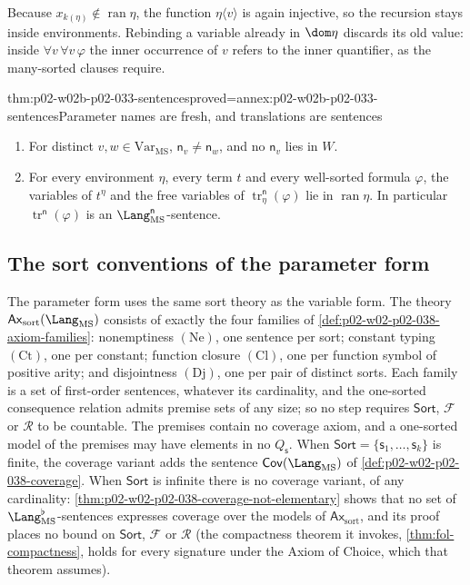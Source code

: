 Because \(x_{k(\eta)}\notin\operatorname{ran}\eta\), the function
\(\eta\langle v\rangle\) is again injective, so the recursion stays inside
environments.  Rebinding a variable already in \(\dom\eta\) discards its old
value: inside \(\forall v\,\forall v\,\varphi\) the inner occurrence of
\(v\) refers to the inner quantifier, as the many-sorted clauses require.

\begin{hblemma}{thm:p02-w02b-p02-033-sentences}{proved=annex:p02-w02b-p02-033-sentences}{Parameter names are fresh, and translations are sentences}
\begin{enumerate}
\item For distinct \(v,w\in\mathrm{Var}_{\mathrm{MS}}\),
      \(\mathsf n_v\ne\mathsf n_w\), and no \(\mathsf n_v\) lies in \(W\).
\item For every environment \(\eta\), every term \(t\) and every well-sorted
      formula \(\varphi\), the variables of \(t^{\eta}\) and the free
      variables of \(\operatorname{tr}^{\mathsf n}_{\eta}(\varphi)\) lie in
      \(\operatorname{ran}\eta\).  In particular
      \(\operatorname{tr}^{\mathsf n}(\varphi)\) is an
      \(\Lang_{\mathrm{MS}}^{\mathsf n}\)-sentence.
\end{enumerate}
\end{hblemma}

\subsection{The sort conventions of the parameter form}
\label{sec:p02-w02b-p02-033-conventions}

The parameter form uses the same sort theory as the variable form.  The theory
\(\mathsf{Ax}_{\mathrm{sort}}(\Lang_{\mathrm{MS}})\) consists of exactly the
four families of \cref{def:p02-w02-p02-038-axiom-families}: nonemptiness
\((\mathrm{Ne})\), one sentence per sort; constant typing \((\mathrm{Ct})\),
one per constant; function closure \((\mathrm{Cl})\), one per function symbol
of positive arity; and disjointness \((\mathrm{Dj})\), one per pair of
distinct sorts.  Each family is a set of first-order sentences, whatever its
cardinality, and the one-sorted consequence relation admits premise sets of
any size; so no step requires \(\mathsf{Sort}\), \(\mathcal F\) or
\(\mathcal R\) to be countable.  The premises contain no coverage axiom, and a
one-sorted model of the premises may have elements in no \(Q_{\mathsf s}\).
When \(\mathsf{Sort}=\{\mathsf s_1,\ldots,\mathsf s_k\}\) is finite, the
coverage variant adds the sentence \(\mathsf{Cov}(\Lang_{\mathrm{MS}})\) of
\cref{def:p02-w02-p02-038-coverage}.  When \(\mathsf{Sort}\) is infinite
there is no coverage variant, of any cardinality:
\cref{thm:p02-w02-p02-038-coverage-not-elementary} shows that no set of
\(\Lang_{\mathrm{MS}}^{\flat}\)-sentences expresses coverage over the models
of \(\mathsf{Ax}_{\mathrm{sort}}\), and its proof places no bound on
\(\mathsf{Sort}\), \(\mathcal F\) or \(\mathcal R\) (the compactness theorem
it invokes, \cref{thm:fol-compactness}, holds for every signature under the
Axiom of Choice, which that theorem assumes).

